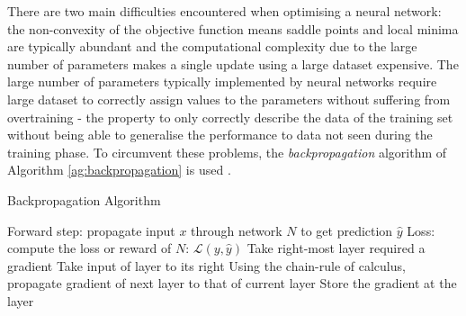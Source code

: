 There are two main difficulties encountered when optimising a neural network: the non-convexity of the objective function means saddle points and local minima are typically abundant and the computational complexity due to the large number of parameters makes a single update using a large dataset expensive. The large number of parameters typically implemented by neural networks require large dataset to correctly assign values to the parameters without suffering from overtraining - the property to only correctly describe the data of the training set without being able to generalise the performance to data not seen during the training phase. To circumvent these problems, the \textit{backpropagation} algorithm of Algorithm \ref{ag:backpropagation} is used \cite{backprop}.

\begin{algorithm}
    \caption{Backpropagation Algorithm}
    \begin{algorithmic}
        \State Forward step: propagate input $x$ through network $N$ to get prediction $\hat{y}$
        \State Loss: compute the loss or reward of $N$: $\mathcal{L}(y, \hat{y})$
            \State Take right-most layer required a gradient
            \State Take input of layer to its right 
            \State Using the chain-rule of calculus, propagate gradient of next layer to that of current layer
            \State Store the gradient at the layer
        \EndWhile
    \EndFunction
    \end{algorithmic}
    \label{ag:backpropagation}
\end{algorithm}

